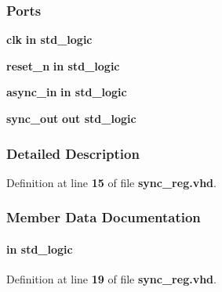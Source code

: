 \subsubsection*{Ports}
 \begin{DoxyCompactItemize}
\item 
{\bf clk}  {\bfseries {\bfseries \textcolor{keywordflow}{in}\textcolor{vhdlchar}{ }}} {\bfseries \textcolor{comment}{std\+\_\+logic}\textcolor{vhdlchar}{ }} 
\item 
{\bf reset\+\_\+n}  {\bfseries {\bfseries \textcolor{keywordflow}{in}\textcolor{vhdlchar}{ }}} {\bfseries \textcolor{comment}{std\+\_\+logic}\textcolor{vhdlchar}{ }} 
\item 
{\bf async\+\_\+in}  {\bfseries {\bfseries \textcolor{keywordflow}{in}\textcolor{vhdlchar}{ }}} {\bfseries \textcolor{comment}{std\+\_\+logic}\textcolor{vhdlchar}{ }} 
\item 
{\bf sync\+\_\+out}  {\bfseries {\bfseries \textcolor{keywordflow}{out}\textcolor{vhdlchar}{ }}} {\bfseries \textcolor{comment}{std\+\_\+logic}\textcolor{vhdlchar}{ }} 
\end{DoxyCompactItemize}


\subsubsection{Detailed Description}


Definition at line {\bf 15} of file {\bf sync\+\_\+reg.\+vhd}.



\subsubsection{Member Data Documentation}
\paragraph[{async\+\_\+in}]{ {\bfseries \textcolor{keywordflow}{in}\textcolor{vhdlchar}{ }} {\bfseries \textcolor{comment}{std\+\_\+logic}\textcolor{vhdlchar}{ }} \hspace{0.3cm}{\ttfamily [Port]}}\label{classsync__reg_a0468fb72e5220eac4f182269f3dd1734}


Definition at line {\bf 19} of file {\bf sync\+\_\+reg.\+vhd}.

